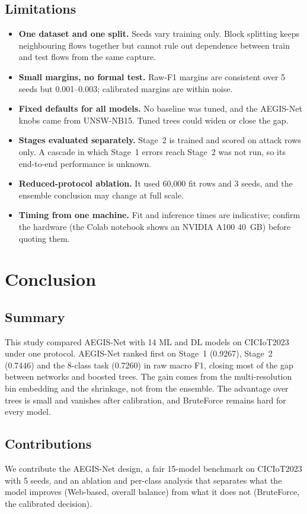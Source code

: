 \documentclass[11pt,a4paper]{article}
\newcommand{\aegis}{AEGIS-Net}
\begin{document}
\subsection{Limitations}\label{sec:limits}
\begin{itemize}
  \item \textbf{One dataset and one split.} Seeds vary training only. Block splitting keeps neighbouring flows together but cannot rule out dependence between train and test flows from the same capture.
  \item \textbf{Small margins, no formal test.} Raw-F1 margins are consistent over 5 seeds but 0.001--0.003; calibrated margins are within noise.
  \item \textbf{Fixed defaults for all models.} No baseline was tuned, and the \aegis{} knobs came from UNSW-NB15. Tuned trees could widen or close the gap.
  \item \textbf{Stages evaluated separately.} Stage~2 is trained and scored on attack rows only. A cascade in which Stage~1 errors reach Stage~2 was not run, so its end-to-end performance is unknown.
  \item \textbf{Reduced-protocol ablation.} It used 60{,}000 fit rows and 3 seeds, and the ensemble conclusion may change at full scale.
  \item \textbf{Timing from one machine.} Fit and inference times are indicative; confirm the hardware (the Colab notebook shows an NVIDIA A100 40~GB) before quoting them.
\end{itemize}

\section{Conclusion}

\subsection{Summary}
This study compared \aegis{} with 14 ML and DL models on CICIoT2023 under one protocol. \aegis{} ranked first on Stage~1 (0.9267), Stage~2 (0.7446) and the 8-class task (0.7260) in raw macro F1, closing most of the gap between networks and boosted trees. The gain comes from the multi-resolution bin embedding and the shrinkage, not from the ensemble. The advantage over trees is small and vanishes after calibration, and BruteForce remains hard for every model.

\subsection{Contributions}
We contribute the \aegis{} design, a fair 15-model benchmark on CICIoT2023 with 5 seeds, and an ablation and per-class analysis that separates what the model improves (Web-based, overall balance) from what it does not (BruteForce, the calibrated decision).
\end{document}
